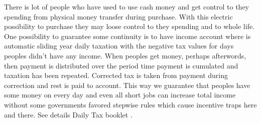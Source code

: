 There is lot of people who have used to use cash money and get control to they spending from physical money transfer during purchase. With this electric possibility to purchase they may loose control to they spending and to whole life. One possibility to guarantee some continuity is to have income account where is automatic sliding year daily taxation with the negative tax values for days peoples didn't have any income. When peoples get money, perhaps afterwords, then payment is distributed over the period time payment is cumulated and taxation has been repeated. Corrected tax is taken from payment during correction and rest is paid to account. This way we guarantee that peoples have some money on every day and even all short jobs can increase total income without some governments favored stepwise rules which cause incentive traps here and there. See details Daily Tax booklet\cite{DayTax}
.

